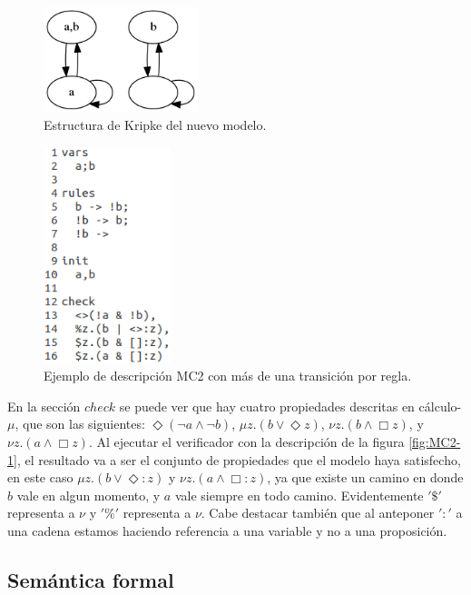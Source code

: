 \begin{figure}[H]
  \centering
  \includegraphics[width=0.4\textwidth]{Figures/kripke5.png}
  \caption{Estructura de Kripke del nuevo modelo.}
  \label{fig:kripke5}
\end{figure}

\begin{figure}[H]
  \centering
  \includegraphics[width=0.33\textwidth]{Figures/modeloMC2-3.png}
  \caption{Ejemplo de descripción MC2 con más de una transición por regla.}
  \label{fig:MC2-3}
\end{figure}

En la sección $check$ se puede ver que hay cuatro propiedades descritas en cálculo-$\mu$, que son las siguientes: $\Diamond (\neg a \land \neg b)$, $\mu z. (b \lor \Diamond z)$, $\nu z. (b \land \Box z)$, y $\nu z. (a \land \Box z)$. Al ejecutar el verificador con la descripción de la figura \ref{fig:MC2-1}, el resultado va a ser el conjunto de propiedades que el modelo haya satisfecho, en este caso $\mu z. (b \lor \Diamond : z)$ y $\nu z. (a \land \Box : z)$, ya que existe un camino en donde $b$ vale en algun momento, y $a$ vale siempre en todo camino. Evidentemente $'\$'$ representa a $\nu$ y $'\%'$ representa a $\nu$. Cabe destacar también que al anteponer $':'$ a una cadena estamos haciendo referencia a una variable y no a una proposición.

\subsection{Semántica formal}

